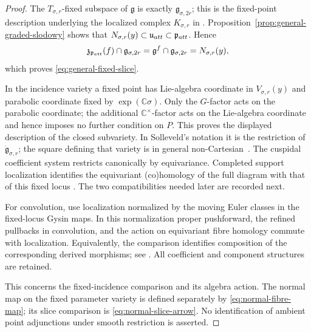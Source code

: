 \documentclass[10pt,a4paper]{amsart}
\begin{document}
\begin{proof}
The $T_{\sigma,r}$-fixed subspace of $\mathfrak g$ is exactly
$\mathfrak g_{\sigma,2r}$; this is the fixed-point description underlying
the localized complex $K_{\sigma,r}$ in \cite[Section~2.1]{Solleveld}.
Proposition~\ref{prop:general-graded-slodowy} shows that
$N_{\sigma,r}(y)\subset\mathfrak u_{\rm att}\subset\mathfrak p_{\rm att}$.
Hence
\[
 \mathfrak z_{\mathfrak p_{\rm att}}(f)\cap\mathfrak g_{\sigma,2r}
 =\mathfrak g^f\cap\mathfrak g_{\sigma,2r}
 =N_{\sigma,r}(y),
\]
which proves \eqref{eq:general-fixed-slice}.

In the incidence variety a fixed point has Lie-algebra coordinate in
$V_{\sigma,r}(y)$ and parabolic coordinate fixed by
$\exp(\mathbb C\sigma)$.  Only the $G$-factor acts on the parabolic
coordinate; the additional $\mathbb C^\times$-factor acts on the
Lie-algebra coordinate and hence imposes no further condition on $P$.
This proves the displayed description of the closed subvariety.  In
Solleveld's notation it is the restriction of
$\dot{\mathfrak g}_{\sigma,r}$; the square defining that variety is in
general non-Cartesian~\cite[Section~2.1, equations (2.11)--(2.14)]{Solleveld}.
The cuspidal coefficient system restricts canonically by equivariance.
Completed support localization identifies the equivariant (co)homology of
the full diagram with that of this fixed locus
\cite[Theorem~6.2(1)--(3)]{GKM}.  The two compatibilities needed later are
recorded next.

For convolution, use localization normalized by the moving Euler
classes in the fixed-locus Gysin maps.  In this normalization proper
pushforward, the refined pullbacks in convolution, and the action on
equivariant fibre homology commute with localization.  Equivalently,
the comparison identifies composition of the corresponding derived
morphisms; see \cite[Proposition~2.4 and Theorem~2.5]{Solleveld}.
All coefficient and component structures are retained.

This concerns the fixed-incidence comparison and its algebra action.
The normal map on the fixed parameter variety is defined separately
by \eqref{eq:normal-fibre-map}; its slice comparison is
\eqref{eq:normal-slice-arrow}.  No identification of ambient point
adjunctions under smooth restriction is asserted.


\end{proof}
\end{document}
